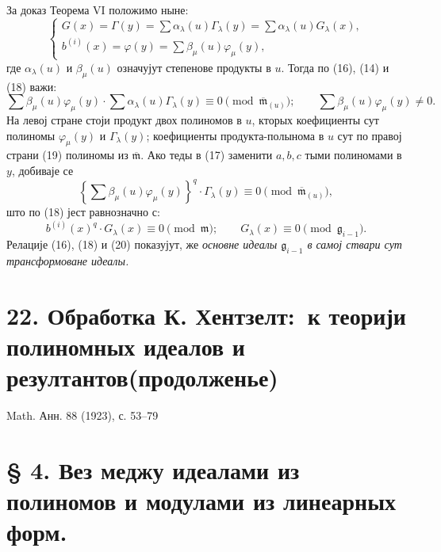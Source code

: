 \documentclass[11pt]{article}
\providecommand{\mideal}{\mathfrak m}
\providecommand{\gideal}{\mathfrak g}
\providecommand{\zero}[1]{\equiv 0\pmod{#1}}
\begin{document}
За доказ Теорема VI положимо ныне:
\begin{equation}
\begin{cases}
 G(x)=\Gamma(y)=\sum \alpha_\lambda(u)\Gamma_\lambda(y)=\sum \alpha_\lambda(u)G_\lambda(x),\\
 b^{(i)}(x)=\varphi(y)=\sum \beta_\mu(u)\varphi_\mu(y),
\end{cases}
\tag{18}
\end{equation}
где $\alpha_\lambda(u)$ и $\beta_\mu(u)$ означујут степенове продукты в $u$. Тогда по (16), (14) и (18) важи:
\begin{equation}
 \sum\beta_\mu(u)\varphi_\mu(y)\cdot
 \sum\alpha_\lambda(u)\Gamma_\lambda(y)\zero{\overline{\mideal}_{(u)}};
 \qquad
 \sum\beta_\mu(u)\varphi_\mu(y)\ne0.
\tag{19}
\end{equation}
На левој стране стоји продукт двох полиномов в $u$, кторых коефициенты сут полиномы $\varphi_\mu(y)$ и $\Gamma_\lambda(y)$; коефициенты продукта-полынома в $u$ сут по правој страни (19) полиномы из $\overline{\mideal}$. Ако теды в (17) заменити $a,b,c$ тыми полиномами в $y$, добиваје се
\[
 \left\{\sum\beta_\mu(u)\varphi_\mu(y)\right\}^q\cdot \Gamma_\lambda(y)\zero{\overline{\mideal}_{(u)}},
\]
што по (18) јест равнозначно с:
\begin{equation}
 b^{(i)}(x)^q\cdot G_\lambda(x)\zero{\mideal};
 \qquad
 G_\lambda(x)\zero{\gideal_{i-1}}.
\tag{20}
\end{equation}
Релације (16), (18) и (20) показујут, же {\itshape основне идеалы $\gideal_{i-1}$ в самој ствари сут трансформоване идеалы.}

\section*{22. Обработка К. Хентзелт:\ к теорији полиномных идеалов и резултантов\quad (продолженье)}
\begin{center}
Math. Анн. 88 (1923), с. 53--79
\end{center}

\section*{§ 4. Вез меджу идеалами из полиномов и модулами из линеарных форм.}
\end{document}

